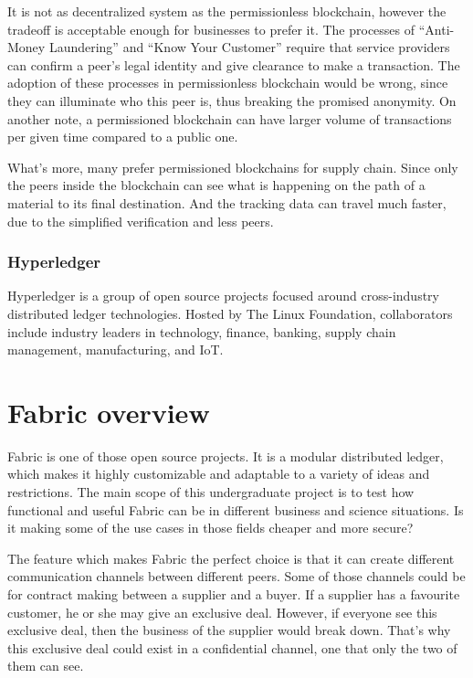 \documentclass[a4paper,11pt]{report}
\begin{document}
	It is not as decentralized system as the permissionless blockchain, however the tradeoff is acceptable enough for businesses to prefer it. The processes of “Anti-Money Laundering” and “Know Your Customer” require that service providers can confirm a peer’s legal identity and give clearance to make a transaction. The adoption of these processes in permissionless blockchain would be wrong, since they can illuminate who this peer is, thus breaking the promised anonymity. On another note, a permissioned blockchain can have larger volume of transactions per given time compared to a public one. 
	
What’s more, many prefer permissioned blockchains for supply chain. Since only the peers inside the blockchain can see what is happening on the path of a material to its final destination. And the tracking data can travel much faster, due to the simplified verification and less peers. 

\subsubsection{Hyperledger}
Hyperledger is a group of open source projects focused around cross-industry distributed ledger technologies. Hosted by The Linux Foundation, collaborators include industry leaders in technology, finance, banking, supply chain management, manufacturing, and IoT.


\section{Fabric overview}
	Fabric is one of those open source projects. It is a modular distributed ledger, which makes it highly customizable and adaptable to a variety of ideas and restrictions. The main scope of this undergraduate project is to test how functional and useful Fabric can be in different business and science situations. Is it making some of the use cases in those fields cheaper and more secure?
	
The feature which makes Fabric the perfect choice is that it can create different communication channels between different peers. Some of those channels could be for contract making between a supplier and a buyer. If a supplier has a favourite customer, he or she may give an exclusive deal. However, if everyone see this exclusive deal, then the business of the supplier would break down. That’s why this exclusive deal could exist in a confidential channel, one that only the two of them can see. 
\end{document}
